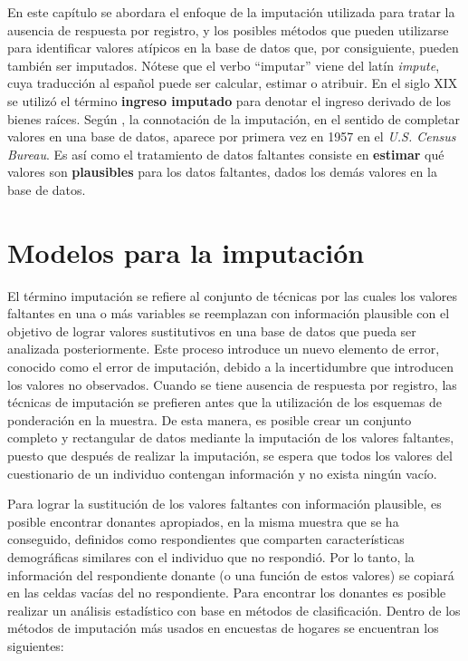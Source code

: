 \documentclass[
  12pt,
]{book}
\begin{document}
En este capítulo se abordara el enfoque de la imputación utilizada para tratar la ausencia de respuesta por registro, y los posibles métodos que pueden utilizarse para identificar valores atípicos en la base de datos que, por consiguiente, pueden también ser imputados. Nótese que el verbo ``imputar'' viene del latín \emph{impute}, cuya traducción al español puede ser calcular, estimar o atribuir. En el siglo XIX se utilizó el término \textbf{ingreso imputado} para denotar el ingreso derivado de los bienes raíces. Según \citet{VanBuuren}, la connotación de la imputación, en el sentido de completar valores en una base de datos, aparece por primera vez en 1957 en el \emph{U.S. Census Bureau}. Es así como el tratamiento de datos faltantes consiste en \textbf{estimar} qué valores son \textbf{plausibles} para los datos faltantes, dados los demás valores en la base de datos.

\hypertarget{modelos-para-la-imputaciuxf3n}{%
\section{Modelos para la imputación}\label{modelos-para-la-imputaciuxf3n}}

El término imputación se refiere al conjunto de técnicas por las cuales los valores faltantes en una o más variables se reemplazan con información plausible con el objetivo de lograr valores sustitutivos en una base de datos que pueda ser analizada posteriormente. Este proceso introduce un nuevo elemento de error, conocido como el error de imputación, debido a la incertidumbre que introducen los valores no observados. Cuando se tiene ausencia de respuesta por registro, las técnicas de imputación se prefieren antes que la utilización de los esquemas de ponderación en la muestra. De esta manera, es posible crear un conjunto completo y rectangular de datos mediante la imputación de los valores faltantes, puesto que después de realizar la imputación, se espera que todos los valores del cuestionario de un individuo contengan información y no exista ningún vacío.

Para lograr la sustitución de los valores faltantes con información plausible, es posible encontrar donantes apropiados, en la misma muestra que se ha conseguido, definidos como respondientes que comparten características demográficas similares con el individuo que no respondió. Por lo tanto, la información del respondiente donante (o una función de estos valores) se copiará en las celdas vacías del no respondiente. Para encontrar los donantes es posible realizar un análisis estadístico con base en métodos de clasificación. Dentro de los métodos de imputación más usados en encuestas de hogares se encuentran los siguientes:
\end{document}
